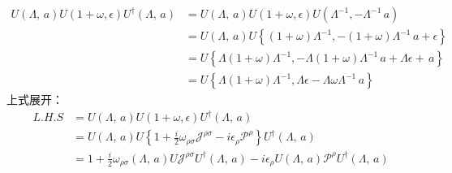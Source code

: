\[ 
\begin{aligned}
        {U}(\Lambda,\,a){U}(1+\omega,\epsilon){U}^\dagger(\Lambda,\,a)&={U}(\Lambda,\,a){U}(1+\omega,\epsilon){U}(\Lambda^{-1},-\Lambda^{-1}\,a)\\
        &={U}(\Lambda,\,a){U}\left\{(1+\omega)\Lambda^{-1},-(1+\omega)\Lambda^{-1}\,a+\epsilon\right\}\\
        &={U}\left\{\Lambda(1+\omega)\Lambda^{-1},-\Lambda(1+\omega)\Lambda^{-1}\,a+\Lambda\epsilon+\,a\right\}\\
        &={U}\left\{\Lambda(1+\omega)\Lambda^{-1},\Lambda\epsilon-\Lambda\omega\Lambda^{-1}\,a\right\}
\end{aligned}
\]上式展开：
\[    \begin{aligned}
        L.H.S&={U}(\Lambda,\,a){U}(1+\omega,\epsilon){U}^\dagger(\Lambda,\,a)\\
        &={U}(\Lambda,\,a){U}\left\{{1}+\frac{i}{2}\omega_{\rho\sigma}\mathscr{J}^{\rho\sigma} -i\epsilon_\rho \mathscr{P}^\rho\right\}{U}^\dagger(\Lambda,\,a)\\
        &={1} +\frac{i}{2}\omega_{\rho\sigma}(\Lambda,\,a){U}\mathscr{J}^{\rho\sigma}{U}^\dagger(\Lambda,\,a)-i\epsilon_\rho{U}(\Lambda,\,a)\mathscr{P}^\rho{U}^\dagger(\Lambda,\,a)\\
    \end{aligned}\]
